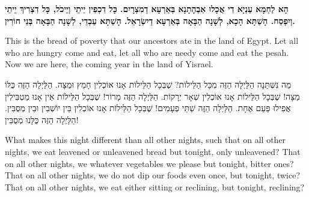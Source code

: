 

{\bfseries
הָא לַחְמָא עַנְיָא דִי אֲכָלוּ אַבְהָתָנָא בְּאַרְעָא דְמִצְרָיִם. כָּל דִכְפִין יֵיתֵי וְיֵיכֹל, כָּל דִצְרִיךְ יֵיתֵי וְיִפְסַח. הָשַׁתָּא הָכָא, לְשָׁנָה הַבָּאָה בְּאַרְעָא דְיִשְׂרָאֵל. הָשַׁתָּא עַבְדֵי, לְשָׁנָה הַבָּאָה בְּנֵי חוֹרִין.
}

\begin{english}
This is the bread of poverty that our ancestors ate in the land of Egypt. Let all who are hungry come and eat, let all who are needy come and eat the pesah. Now we are here, the coming year in the land of Yisrael.
\end{english}

\vspace{1em}



מַה נִּשְּׁתַּנָה הַלַּיְלָה הַזֶּה מִכָּל הַלֵּילוֹת? 
שֶׁבְּכָל הַלֵּילוֹת אָנוּ אוֹכְלִין חָמֵץ וּמַצָּה. הַלַּיְלָה הַזֶּה כֻּלּוֹ מַצָּה!
שֶׁבְּכָל הַלֵּילוֹת אָנוּ אוֹכְלִין שְׁאָר יְרָקוֹת. הַלַּיְלָה הַזֶּה מָרוֹר!
שֶׁבְּכָל הַלֵּילוֹת אֵין אָנוּ מַטְבִּילִין אֲפִילוּ פַּעַם אֶחָת. הַלַּיְלָה הַזֶּה שְׁתֵּי פְעָמִים!
שֶׁבְּכָל הַלֵּילוֹת אָנוּ אוֹכְלִין בֵּין יוֹשְׁבִין וּבֵין מְסֻבִּין. הַלַּיְלָה הַזֶּה כֻּלָּנוּ מְסֻבִּין!

\begin{english}
What makes this night different than all other nights, such that on all other nights, we eat leavened or unleavened bread but tonight, only unleavened? That on all other nights, we whatever vegetables we please but tonight, bitter ones? That on all other nights, we do not dip our foods even once, but tonight, twice? That on all other nights, we eat either sitting or reclining, but tonight, reclining?
\end{english}

\vspace{1em}


